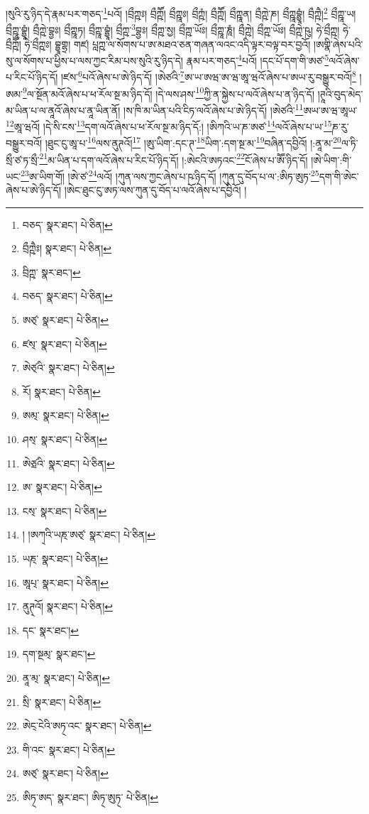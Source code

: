 །སུའི་རུ་ཉིད་དེ་རྣམ་པར་གཅད་\footnote{བཅད་  སྣར་ཐང་།  པེ་ཅིན། }པའོ། །བྲྀཀྵཿ། བྲྀཀྵཽ། བྲྀཀྵཱཿ། བྲྀཀྵཾ། བྲྀཀྵཽ། བྲྀཀྵཱན། བྲྀཀྵེ་ཎ། བྲྀཀྵཱབྷྱཱཾ། བྲྀཀྵཻ།\footnote{བྲྀཀྵཻཿ།  སྣར་ཐང་།  པེ་ཅིན། } བྲྀཀྵཱ་ཡ། བྲྀཀྵཱ་བྷྱཱཾ། བྲྀཀྵེ་བྷྱཿ། བྲྀཀྵཱཏ། བྲྀཀྵཱ་བྷྱཱཾ། བྲྀཀྵ་\footnote{བྲིཀྵ་  སྣར་ཐང་། }བྷྱཿ། བྲྀཀྵ་སྱ། བྲྀཀྵ་ཡོཿ། བྲྀཀྵཱ་ཎཱཾ། བྲྀཀྵེ། བྲྀཀྵ་ཡོཿ། བྲྀཀྵེ་ཥུ། ཧེ་བྲྀཀྵ། ཧེ་བྲྀཀྵཽ། ཧེ་བྲྀཀྵཿ། བྷྱཱགྷྲ། གཛ། པླཀྵ་ལ་སོགས་པ་ཨ་མཐའ་ཅན་གཞན་ལའང་འདི་ལྟར་བལྟ་བར་བྱའོ། །ཨགྣི་ཞེས་པའི་སུ་ལ་སོགས་པ་ཕྱིས་པ་ལས་ཀྱང་རིམ་པས་སུའི་རུ་ཉིད་དེ། རྣམ་པར་གཅད་\footnote{བཅད་  སྣར་ཐང་།  པེ་ཅིན། }པའོ། །དང་པོ་དག་གི་ཨཙ་\footnote{ཨཙ྄་  སྣར་ཐང་།  པེ་ཅིན། }ལའོ་ཞེས་པ་རིང་པོ་ཉིད་དོ། །ཛས་\footnote{ཛས྄་  སྣར་ཐང་།  པེ་ཅིན། }པའོ་ཞེས་པ་ཨེ་ཉིད་དོ། །ཨེཙའི་\footnote{ཨེཙ྄འི་  སྣར་ཐང་།  པེ་ཅིན། }ཨ་ཡ་ཨཝ་ཨ་ཝ་ཨཱ་ཝའོ་ཞེས་པ་ཨཡ་རུ་བསྒྱུར་བའོ།\footnote{རོ།  སྣར་ཐང་།  པེ་ཅིན། } །ཨམ་\footnote{ཨམ྄་  སྣར་ཐང་།  པེ་ཅིན། }ལ་སྔོན་མའོ་ཞེས་པ་ཕ་རོལ་སྔ་མ་ཉིད་དོ། །དེ་ལས་ཤས་\footnote{ཤས྄་  སྣར་ཐང་།  པེ་ཅིན། }ཀྱི་ན་སྐྱེས་པ་ལའོ་ཞེས་པ་ན་ཉིད་དོ། །ཊཱའི་བུད་མེད་མ་ཡིན་པ་ལ་ནཱའོ་ཞེས་པ་ནཱ་ཡིན་ནོ། །ས་ཁི་མ་ཡིན་པའི་ངིཏ་ལའོ་ཞེས་པ་ཨེ་ཉིད་དོ། །ཨེཙའི་\footnote{ཨེཙྲའི་  སྣར་ཐང་།  པེ་ཅིན། }ཨཡ་ཨ་ཝ་ཨཱཡ་\footnote{ཨ་  སྣར་ཐང་།  པེ་ཅིན། }ཨཱ་ཝའོ། །དེ་སི་ངས་\footnote{ངས྄་  སྣར་ཐང་།  པེ་ཅིན། }དག་ལའོ་ཞེས་པ་ཕ་རོལ་སྔ་མ་ཉིད་དོ:། །ཨིཀའི་ཡ་ཎ་ཨཙ་\footnote{། །ཨཀ྄འི་ཡཎ྄་ཨཙ྄་  སྣར་ཐང་།  པེ་ཅིན། }ལའོ་ཞེས་པ་ཡ་\footnote{ཡཎ྄་  སྣར་ཐང་།  པེ་ཅིན། }ཎ་རུ་བསྒྱུར་བའོ། །ཐུང་ངུ་ཨཱ་པ་\footnote{ཨཱཔ྄་  སྣར་ཐང་།  པེ་ཅིན། }ལས་ནུཊའོ།\footnote{ནུཊ྄འོ།  སྣར་ཐང་།  པེ་ཅིན། } །ཨུ་ཡིག་:དང་ཊ་\footnote{དང་  སྣར་ཐང་། }ཡིག་:དག་སྔ་མ་\footnote{དག་སྔམ྄་  སྣར་ཐང་། }བཞིན་དབྱིའོ། །:ནཱ་མ་\footnote{ནཱ་མ྄་  སྣར་ཐང་།  པེ་ཅིན། }ལ་ཏི་སྲྀ་ཙ་ཏ་སྲྀ་\footnote{སྲི་  སྣར་ཐང་།  པེ་ཅིན། }མ་ཡིན་པ་དག་ལའོ་ཞེས་པ་རིང་པོ་ཉིད་དོ། །:ཨེངའི་ཨཏའང་\footnote{ཨེང྄་ངེའི་ཨཏ྄་འང་  སྣར་ཐང་།  པེ་ཅིན། }ངོ་ཞེས་པ་ཨཽ་ཉིད་དོ། །ཨེ་ཡིག་:གི་ཡང་\footnote{གི་འང་  སྣར་ཐང་།  པེ་ཅིན། }ཨ་ཡིག་གོ། །ཨེ་ཙ་\footnote{ཨཙ྄་  སྣར་ཐང་།  པེ་ཅིན། }ལའོ། །ཀུན་ལས་ཀྱང་ཞེས་པ་ཥ་ཉིད་དོ། །ཀུན་དུ་བོད་པ་ལ་:ཨིཏ་ཨུཏ་\footnote{ཨིཏ྄་ཨད་  སྣར་ཐང་། ཨིཏ྄་ཨུཏ྄་  པེ་ཅིན། }དག་གི་ཨེང་ཞེས་པ་ཨེ་ཉིད་དོ། །ཨེང་ཐུང་ངུ་ཨཏ་ལས་ཀུན་དུ་བོད་པ་ལའོ་ཞེས་པ་དབྱིའོ། །
